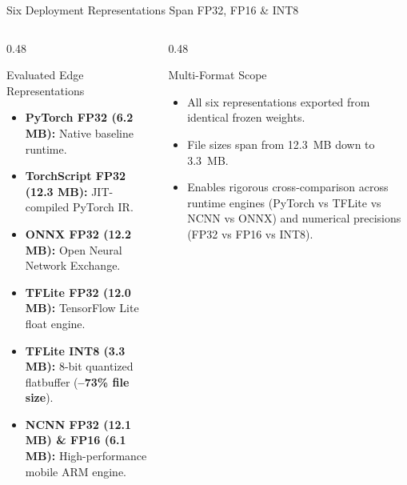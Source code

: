 \documentclass[aspectratio=169,10pt]{beamer}
\begin{document}
\begin{frame}{Six Deployment Representations Span FP32, FP16 \& INT8}
\begin{columns}[T]
  \begin{column}{0.48\textwidth}
    \begin{block}{\small Evaluated Edge Representations}
      \small
      \begin{itemize}
        \item \textbf{PyTorch FP32 (6.2 MB):} Native baseline runtime.
        \item \textbf{TorchScript FP32 (12.3 MB):} JIT-compiled PyTorch IR.
        \item \textbf{ONNX FP32 (12.2 MB):} Open Neural Network Exchange.
        \item \textbf{TFLite FP32 (12.0 MB):} TensorFlow Lite float engine.
        \item \textbf{TFLite INT8 (3.3 MB):} 8-bit quantized flatbuffer (\textbf{--73\% file size}).
        \item \textbf{NCNN FP32 (12.1 MB) \& FP16 (6.1 MB):} High-performance mobile ARM engine.
      \end{itemize}
    \end{block}
  \end{column}
  \begin{column}{0.48\textwidth}
    \begin{block}{\small Multi-Format Scope}
      \small
      \begin{itemize}
        \item All six representations exported from identical frozen weights.
        \item File sizes span from 12.3~MB down to 3.3~MB.
        \item Enables rigorous cross-comparison across runtime engines (PyTorch vs TFLite vs NCNN vs ONNX) and numerical precisions (FP32 vs FP16 vs INT8).
      \end{itemize}
    \end{block}
  \end{column}
\end{columns}
\end{frame}
\end{document}
